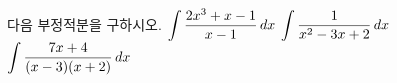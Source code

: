 다음 부정적분을 구하시오.
 $\displaystyle\int\dfrac{2x^3+x-1}{x-1}\mkern3mu dx$
 $\displaystyle\int\dfrac{1}{x^2-3x+2}\mkern3mu dx$
 $\displaystyle\int\dfrac{7x+4}{(x-3)(x+2)}\mkern3mu dx$
